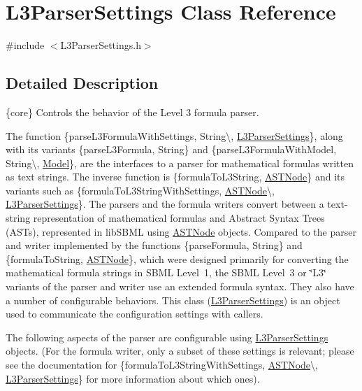 \hypertarget{class_l3_parser_settings}{}\section{L3\+Parser\+Settings Class Reference}
\label{class_l3_parser_settings}


{\ttfamily \#include $<$L3\+Parser\+Settings.\+h$>$}



\subsection{Detailed Description}
\{core\} Controls the behavior of the Level 3 formula parser.



The function \{parse\+L3\+Formula\+With\+Settings, String\textbackslash{}, \hyperlink{class_l3_parser_settings}{L3\+Parser\+Settings}\}, along with its variants \{parse\+L3\+Formula, String\} and \{parse\+L3\+Formula\+With\+Model, String\textbackslash{}, \hyperlink{class_model}{Model}\}, are the interfaces to a parser for mathematical formulas written as text strings. The inverse function is \{formula\+To\+L3\+String, \hyperlink{class_a_s_t_node}{A\+S\+T\+Node}\} and its variants such as \{formula\+To\+L3\+String\+With\+Settings, \hyperlink{class_a_s_t_node}{A\+S\+T\+Node}\textbackslash{}, \hyperlink{class_l3_parser_settings}{L3\+Parser\+Settings}\}. The parsers and the formula writers convert between a text-\/string representation of mathematical formulas and Abstract Syntax Trees (A\+S\+Ts), represented in lib\+S\+B\+ML using \hyperlink{class_a_s_t_node}{A\+S\+T\+Node} objects. Compared to the parser and writer implemented by the functions \{parse\+Formula, String\} and \{formula\+To\+String, \hyperlink{class_a_s_t_node}{A\+S\+T\+Node}\}, which were designed primarily for converting the mathematical formula strings in S\+B\+ML Level~1, the S\+B\+ML Level~3 or \char`\"{}\+L3\char`\"{} variants of the parser and writer use an extended formula syntax. They also have a number of configurable behaviors. This class (\hyperlink{class_l3_parser_settings}{L3\+Parser\+Settings}) is an object used to communicate the configuration settings with callers.

The following aspects of the parser are configurable using \hyperlink{class_l3_parser_settings}{L3\+Parser\+Settings} objects. (For the formula writer, only a subset of these settings is relevant; please see the documentation for \{formula\+To\+L3\+String\+With\+Settings, \hyperlink{class_a_s_t_node}{A\+S\+T\+Node}\textbackslash{}, \hyperlink{class_l3_parser_settings}{L3\+Parser\+Settings}\} for more information about which ones).

